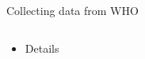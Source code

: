 \documentclass[xcolor=x11names,compress]{beamer}
\renewcommand{\(}{\begin{columns}}
\renewcommand{\)}{\end{columns}}
\newcommand{\<}[1]{\begin{column}{#1}}
\renewcommand{\>}{\end{column}}
\begin{document}
\begin{frame}{Collecting data from WHO}
\begin{columns}[T]
  \begin{column}{0.2\textwidth}
    \begin{itemize}[<+->]
       \item[] Details

     \end{itemize}
     \end{column}

    \begin{column}{0.8\textwidth}
    \begin{center}
      \begin{itemize}

\end{itemize}
\end{center}
\end{column}
\end{columns}
\end{frame}
\end{document}
